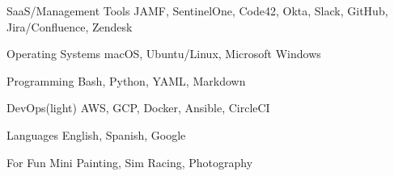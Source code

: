 

\begin{cvskills}


  \cvskill
    {SaaS/Management Tools} %
    {JAMF, SentinelOne, Code42, Okta, Slack, GitHub, Jira/Confluence, Zendesk} %

  \cvskill
    {Operating Systems} %
    {macOS, Ubuntu/Linux, Microsoft Windows} %

  \cvskill
    {Programming} %
    {Bash, Python, YAML, Markdown} %

  \cvskill
    {DevOps(light)} %
    {AWS, GCP, Docker, Ansible, CircleCI} %

  \cvskill
    {Languages} %
    {English, Spanish, Google} %

  \cvskill
    {For Fun}
    {Mini Painting, Sim Racing, Photography}

\end{cvskills}
